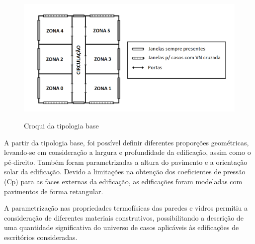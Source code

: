 \documentclass[brazil,hardcopy,openany,a5paper]{ufscthesis}
\begin{document}
		\begin{figure}[h]
			\centering
			\caption{Croqui da tipologia base}
			\includegraphics[width=1\linewidth]{img/croqui_07-11.png}
			\label{fig:croqui}
		\end{figure}
		
		
		A partir da tipologia base, foi possível definir diferentes proporções geométricas, levando-se em consideração a largura e profundidade da edificação, assim como o pé-direito. Também foram parametrizadas a altura do pavimento e a orientação solar da edificação.
		Devido a limitações na obtenção dos coeficientes de pressão (Cp) para as faces externas da edificação, as edificações foram modeladas com pavimentos de forma retangular.
		
		A parametrização nas propriedades termofísicas das paredes e vidros permitiu a consideração de diferentes materiais construtivos, possibilitando a descrição de uma quantidade significativa do universo de casos aplicáveis às edificações de escritórios consideradas. %
		
\end{document}
